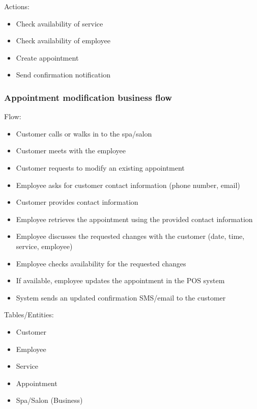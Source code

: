 \documentclass[]{VUMIFTemplateClass}
\begin{document}
Actions:
\begin{itemize}
    \setlength{\itemsep}{2pt}
    \setlength{\parskip}{0pt}
    \setlength{\parsep}{0pt}
    \item Check availability of service
    \item Check availability of employee
    \item Create appointment
    \item Send confirmation notification
\end{itemize}

\subsubsection{Appointment modification business flow}

Flow:
\begin{itemize}
    \setlength{\itemsep}{2pt}
    \setlength{\parskip}{0pt}
    \setlength{\parsep}{0pt}
    \item Customer calls or walks in to the spa/salon
    \item Customer meets with the employee
    \item Customer requests to modify an existing appointment
    \item Employee asks for customer contact information (phone number, email)
    \item Customer provides contact information
    \item Employee retrieves the appointment using the provided contact information
    \item Employee discusses the requested changes with the customer (date, time, service, employee)
    \item Employee checks availability for the requested changes
    \item If available, employee updates the appointment in the POS system
    \item System sends an updated confirmation SMS/email to the customer
\end{itemize}

Tables/Entities:
\begin{itemize}
    \setlength{\itemsep}{2pt}
    \setlength{\parskip}{0pt}
    \setlength{\parsep}{0pt}
    \item Customer
    \item Employee
    \item Service
    \item Appointment
    \item Spa/Salon (Business)
\end{itemize}
\end{document}
